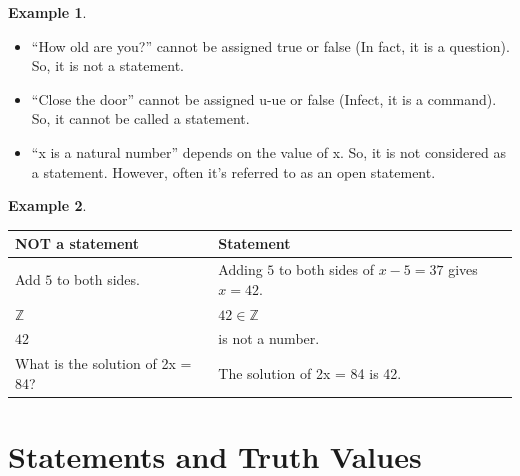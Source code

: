 \documentclass[
]{book}
\providecommand{\tightlist}{%
  \setlength{\itemsep}{0pt}\setlength{\parskip}{0pt}}
\theoremstyle{definition}
\theoremstyle{definition}
\newtheorem{example}{Example}[chapter]
\theoremstyle{definition}
\theoremstyle{definition}
\theoremstyle{remark}
\begin{document}
\begin{example}
\protect\hypertarget{exm:unnamed-chunk-5}{}\label{exm:unnamed-chunk-5}\leavevmode

\begin{itemize}
\tightlist
\item
  ``How old are you?'' cannot be assigned true or false (In fact, it is a
  question). So, it is not a statement.
\item
  ``Close the door'' cannot be assigned u-ue or false (Infect, it is a
  command). So, it cannot be called a statement.
\item
  ``x is a natural number'' depends on the value of x. So, it is not
  considered as a statement. However, often it's referred to as an
  open statement.
\end{itemize}

\end{example}

\begin{example}
\protect\hypertarget{exm:unnamed-chunk-6}{}\label{exm:unnamed-chunk-6}\leavevmode

\begin{longtable}[]{@{}
  >{\raggedright\arraybackslash}p{}
  >{\raggedright\arraybackslash}p{}@{}}
\toprule\noalign{}
\begin{minipage}[b]{\linewidth}\raggedright
\textbf{NOT a statement}
\end{minipage} & \begin{minipage}[b]{\linewidth}\raggedright
\textbf{Statement}
\end{minipage} \\
\midrule\noalign{}
\endhead
\bottomrule\noalign{}
\endlastfoot
Add \(5\) to both sides. & Adding \(5\) to both sides of \(x − 5 = 37\) gives \(x = 42\). \\
\(\mathbb{Z}\) & \(42 \in \mathbb{Z}\) \\
\(42\) & 42 is not a number. \\
What is the solution of 2x = 84? & The solution of 2x = 84 is 42. \\
\end{longtable}

\end{example}

\section{Statements and Truth Values}\label{statements-and-truth-values}
\end{document}
